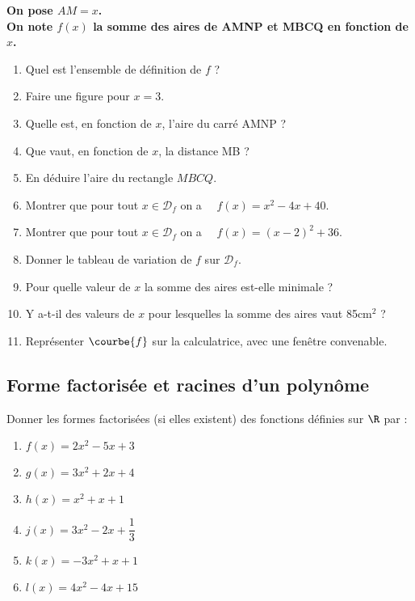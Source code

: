 \documentclass[a4paper,11pt,exos]{nsi} %
\begin{document}
\textbf{\boldmath On pose $AM=x$.\\
	On note $f(x)$ la somme des aires de AMNP et MBCQ  en fonction de $x$.}

\begin{enumerate}
	\item 	Quel est l'ensemble de définition de $f$ ? 
	\item 	Faire une figure pour $x=3$.
	\item 	Quelle est, en fonction de $x$, l'aire du carré AMNP ?
	\item 	Que vaut, en fonction de $x$, la distance MB ?
	\item 	En déduire l'aire du rectangle $MBCQ$.
	\item 	Montrer que pour tout $x\in\mathcal{D}_f$ on a $\quad f(x)=x^2-4x+40$.
	\item 	Montrer que pour tout $x\in\mathcal{D}_f$ on a $\quad f(x)=(x-2)^2+36$.
	\item 	Donner le tableau de variation de $f$ sur $\mathcal{D}_f$.	\item	Pour quelle valeur de $x$ la somme des aires est-elle minimale ?
	\item 	Y a-t-il des valeurs de $x$ pour lesquelles la somme des aires vaut 85cm$^2$ ?
	\item 	Représenter $\courbe{f}$ sur la calculatrice, avec une fenêtre convenable.
\end{enumerate}


\subsection*{Forme factorisée et racines d'un polynôme}

\exo{}
Donner les formes factorisées (si elles existent) des fonctions définies sur $\R$ par :
\begin{multicols}{3}
	\begin{enumerate}[label=\textbullet]
		\item 	$f(x)=2x^2-5x+3$
		\item 	$g(x)=3x^2+2x+4$
		\item 	$h(x)=x^2+x+1$
		\item 	$j(x)=3x^2-2x+\dfrac{1}{3}$
		\item 	$k(x)=-3x^2+x+1$
		\item 	$l(x)=4x^2-4x+15$
	\end{enumerate}
\end{multicols}
\end{document}
